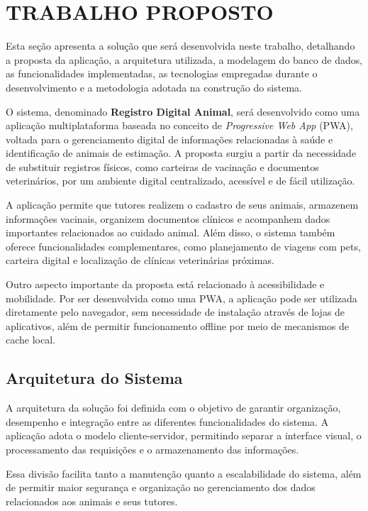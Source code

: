 \documentclass{UNESC}
\begin{document}
\section{TRABALHO PROPOSTO}

Esta seção apresenta a solução que será desenvolvida neste trabalho, detalhando a proposta da aplicação, a arquitetura utilizada, a modelagem do banco de dados, as funcionalidades implementadas, as tecnologias empregadas durante o desenvolvimento e a metodologia adotada na construção do sistema.

O sistema, denominado \textbf{Registro Digital Animal}, será desenvolvido como uma aplicação multiplataforma baseada no conceito de \textit{Progressive Web App} (PWA), voltada para o gerenciamento digital de informações relacionadas à saúde e identificação de animais de estimação. A proposta surgiu a partir da necessidade de substituir registros físicos, como carteiras de vacinação e documentos veterinários, por um ambiente digital centralizado, acessível e de fácil utilização.

A aplicação permite que tutores realizem o cadastro de seus animais, armazenem informações vacinais, organizem documentos clínicos e acompanhem dados importantes relacionados ao cuidado animal. Além disso, o sistema também oferece funcionalidades complementares, como planejamento de viagens com pets, carteira digital e localização de clínicas veterinárias próximas.

Outro aspecto importante da proposta está relacionado à acessibilidade e mobilidade. Por ser desenvolvida como uma PWA, a aplicação pode ser utilizada diretamente pelo navegador, sem necessidade de instalação através de lojas de aplicativos, além de permitir funcionamento offline por meio de mecanismos de cache local.

\subsection{Arquitetura do Sistema}

A arquitetura da solução foi definida com o objetivo de garantir organização, desempenho e integração entre as diferentes funcionalidades do sistema. A aplicação adota o modelo cliente-servidor, permitindo separar a interface visual, o processamento das requisições e o armazenamento das informações.

Essa divisão facilita tanto a manutenção quanto a escalabilidade do sistema, além de permitir maior segurança e organização no gerenciamento dos dados relacionados aos animais e seus tutores.
\end{document}
